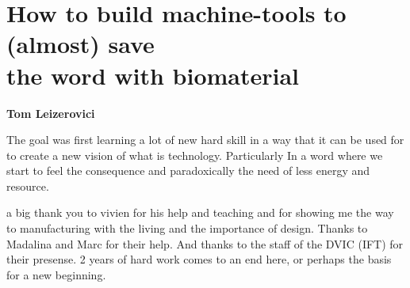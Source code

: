 \chapter*{\centering \Huge How to build machine-tools to (almost) save \\
the word with biomaterial }

\begin{center}
    \textbf{Tom Leizerovici} 
\end{center} 
The goal was first learning a lot of new hard skill in a way that it can be used for to create a new vision of what is technology. Particularly In a word where we start to feel the consequence \- and paradoxically the need \- 
of less energy and resource. 

a big thank you to vivien for his help and teaching and for showing me the way to manufacturing with the living and the importance of design. Thanks to Madalina and Marc for their help. And thanks to the staff of the DVIC (IFT) for their presense. 2 years of hard work comes to an end here, or perhaps the basis for a new beginning.  



\pagebreak

